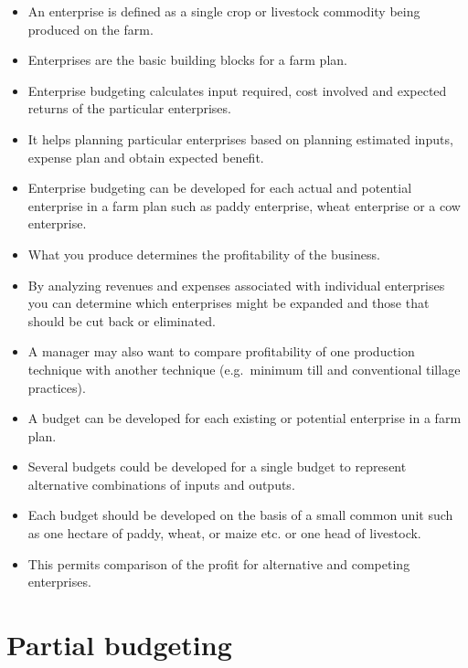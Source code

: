 \documentclass[12pt,ignorenonframetext,aspectratio=169]{beamer}
\providecommand{\tightlist}{%
  \setlength{\itemsep}{0pt}\setlength{\parskip}{0pt}}
\begin{document}
\begin{frame}{}
\protect\hypertarget{section-1}{}
\begin{itemize}
\tightlist
\item
  An enterprise is defined as a single crop or livestock commodity being
  produced on the farm.
\item
  Enterprises are the basic building blocks for a farm plan.
\item
  Enterprise budgeting calculates input required, cost involved and
  expected returns of the particular enterprises.
\item
  It helps planning particular enterprises based on planning estimated
  inputs, expense plan and obtain expected benefit.
\item
  Enterprise budgeting can be developed for each actual and potential
  enterprise in a farm plan such as paddy enterprise, wheat enterprise
  or a cow enterprise.
\item
  What you produce determines the profitability of the business.
\item
  By analyzing revenues and expenses associated with individual
  enterprises you can determine which enterprises might be expanded and
  those that should be cut back or eliminated.
\end{itemize}
\end{frame}

\begin{frame}{}
\protect\hypertarget{section-2}{}
\begin{itemize}
\tightlist
\item
  A manager may also want to compare profitability of one production
  technique with another technique (e.g.~minimum till and conventional
  tillage practices).
\item
  A budget can be developed for each existing or potential enterprise in
  a farm plan.
\item
  Several budgets could be developed for a single budget to represent
  alternative combinations of inputs and outputs.
\item
  Each budget should be developed on the basis of a small common unit
  such as one hectare of paddy, wheat, or maize etc. or one head of
  livestock.
\item
  This permits comparison of the profit for alternative and competing
  enterprises.
\end{itemize}
\end{frame}

\hypertarget{partial-budgeting}{%
\section{Partial budgeting}\label{partial-budgeting}}
\end{document}

